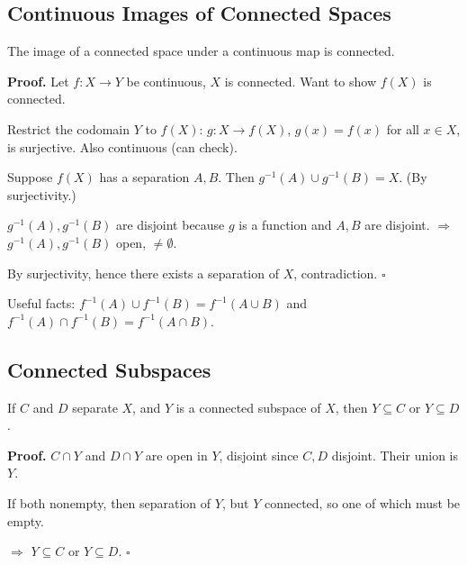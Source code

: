 \documentclass[11pt]{report}
\renewenvironment{proof}[1][Proof]{\noindent\textbf{#1.} }{\hfill$\square$\par\vspace{5pt}}
\begin{document}
\subsection{Continuous Images of Connected Spaces}

\begin{thmbox}
The image of a connected space under a continuous map is connected.
\end{thmbox}

\begin{proof}
Let $f: X \to Y$ be continuous, $X$ is connected. Want to show $f(X)$ is connected.

Restrict the codomain $Y$ to $f(X)$: $g: X \to f(X)$, $g(x) = f(x)$ for all $x \in X$, is surjective. Also continuous (can check).

Suppose $f(X)$ has a separation $A, B$. Then $g^{-1}(A) \cup g^{-1}(B) = X$. (By surjectivity.)

$g^{-1}(A), g^{-1}(B)$ are disjoint because $g$ is a function and $A, B$ are disjoint. $\Rightarrow$ $g^{-1}(A), g^{-1}(B)$ open, $\neq \emptyset$.

By surjectivity, hence there exists a separation of $X$, contradiction.
\end{proof}

\begin{rembox}
Useful facts: $f^{-1}(A) \cup f^{-1}(B) = f^{-1}(A \cup B)$ and $f^{-1}(A) \cap f^{-1}(B) = f^{-1}(A \cap B)$.
\end{rembox}

\subsection{Connected Subspaces}

\begin{lembox}
If $C$ and $D$ separate $X$, and $Y$ is a connected subspace of $X$, then $Y \subseteq C$ or $Y \subseteq D$.
\end{lembox}

\begin{proof}
$C \cap Y$ and $D \cap Y$ are open in $Y$, disjoint since $C, D$ disjoint. Their union is $Y$.

If both nonempty, then separation of $Y$, but $Y$ connected, so one of which must be empty.

$\Rightarrow$ $Y \subseteq C$ or $Y \subseteq D$.
\end{proof}
\end{document}
